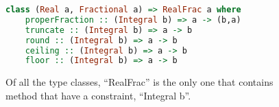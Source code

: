 \begin{figure}[b]
    \centering
    \begin{lstlisting}[language=Haskell]
class (Real a, Fractional a) => RealFrac a where
    properFraction :: (Integral b) => a -> (b,a)
    truncate :: (Integral b) => a -> b
    round :: (Integral b) => a -> b
    ceiling :: (Integral b) => a -> b
    floor :: (Integral b) => a -> b\end{lstlisting}
    \caption{Of all the type classes, ``RealFrac'' is the only one that contains method that have a constraint, ``Integral b''.}
    \label{fig:realfrac}
\end{figure}